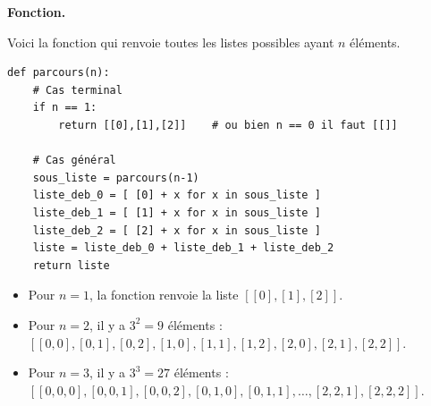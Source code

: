 \documentclass[11pt,class=report,crop=false]{standalone}
\begin{document}
\begin{cours}
\begin{itemize}
\smallskip

\end{itemize}

\textbf{Fonction.}

Voici la fonction  qui renvoie toutes les listes possibles ayant $n$ éléments.

\begin{lstlisting}
def parcours(n):
    # Cas terminal
    if n == 1:
        return [[0],[1],[2]]    # ou bien n == 0 il faut [[]]

    # Cas général
    sous_liste = parcours(n-1)  
    liste_deb_0 = [ [0] + x for x in sous_liste ]
    liste_deb_1 = [ [1] + x for x in sous_liste ]
    liste_deb_2 = [ [2] + x for x in sous_liste ]
    liste = liste_deb_0 + liste_deb_1 + liste_deb_2
    return liste
\end{lstlisting}


\begin{itemize}
  \item Pour $n=1$, la fonction renvoie la liste $[[0], [1], [2]]$.
  \item Pour $n=2$, il y a $3^2=9$ éléments : $[[0, 0], [0, 1], [0, 2], [1, 0], [1, 1], [1, 2], [2, 0], [2, 1], [2, 2]]$.
  \item Pour $n=3$, il y a $3^3=27$ éléments : $[[0, 0, 0], [0, 0, 1], [0, 0, 2], [0, 1, 0], [0, 1, 1], \ldots, [2, 2, 1], [2, 2, 2]]$.
\end{itemize}

\end{cours}


\end{document}
